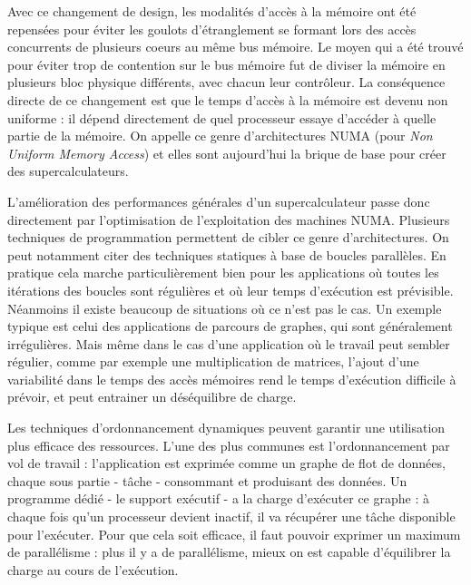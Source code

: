 Avec ce changement de design, les modalités d'accès à la mémoire ont été repensées pour éviter les goulots d'étranglement se formant lors des accès concurrents de plusieurs coeurs au même bus mémoire. Le moyen qui a été trouvé pour éviter trop de contention sur le bus mémoire fut de diviser la mémoire en plusieurs bloc physique différents, avec chacun leur contrôleur.
La conséquence directe de ce changement est que le temps d'accès à la mémoire est devenu non uniforme : il dépend directement de quel processeur essaye d'accéder à quelle partie de la mémoire.
On appelle ce genre d'architectures NUMA (pour \emph{Non Uniform Memory Access}) et elles sont aujourd'hui la brique de base pour créer des supercalculateurs.

L'amélioration des performances générales d'un supercalculateur passe donc directement par l'optimisation de l'exploitation des machines NUMA.
Plusieurs techniques de programmation permettent de cibler ce genre d'architectures.
On peut notamment citer des techniques statiques à base de boucles parallèles.
En pratique cela marche particulièrement bien pour les applications où toutes les itérations des boucles sont régulières et où leur temps d'exécution est prévisible.
Néanmoins il existe beaucoup de situations où ce n'est pas le cas.
Un exemple typique est celui des applications de parcours de graphes, qui sont généralement irrégulières.
Mais même dans le cas d'une application où le travail peut sembler régulier, comme par exemple une multiplication de matrices, l'ajout d'une variabilité dans le temps des accès mémoires rend le temps d'exécution difficile à prévoir, et peut entrainer un déséquilibre de charge.


Les techniques d'ordonnancement dynamiques peuvent garantir une utilisation plus efficace des ressources.
L'une des plus communes est l'ordonnancement par vol de travail : l'application est exprimée comme un graphe de flot de données, chaque sous partie - tâche - consommant et produisant des données.
Un programme dédié - le support exécutif - a la charge d'exécuter ce graphe : à chaque fois qu'un processeur devient inactif, il va récupérer une tâche disponible pour l'exécuter.
Pour que cela soit efficace, il faut pouvoir exprimer un maximum de parallélisme : plus il y a de parallélisme, mieux on est capable d'équilibrer la charge au cours de l'exécution.

